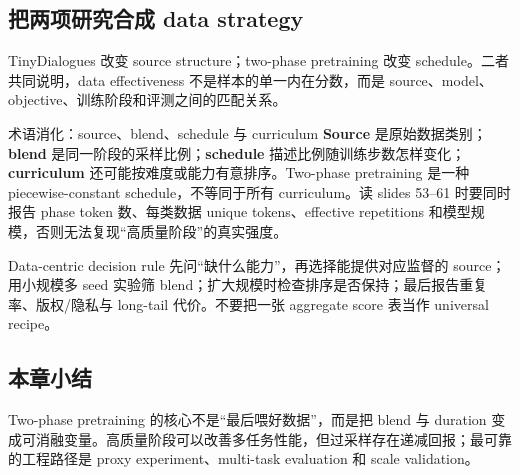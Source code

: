 \subsection{把两项研究合成 data strategy}

TinyDialogues 改变 source structure；two-phase pretraining 改变 schedule。二者共同说明，data effectiveness 不是样本的单一内在分数，而是 source、model、objective、训练阶段和评测之间的匹配关系。







\begin{knowledgebox}{术语消化：source、blend、schedule 与 curriculum}
\textbf{Source} 是原始数据类别；\textbf{blend} 是同一阶段的采样比例；\textbf{schedule} 描述比例随训练步数怎样变化；\textbf{curriculum} 还可能按难度或能力有意排序。Two-phase pretraining 是一种 piecewise-constant schedule，不等同于所有 curriculum。读 slides 53--61 时要同时报告 phase token 数、每类数据 unique tokens、effective repetitions 和模型规模，否则无法复现“高质量阶段”的真实强度。
\end{knowledgebox}

\begin{importantbox}{Data-centric decision rule}
先问“缺什么能力”，再选择能提供对应监督的 source；用小规模多 seed 实验筛 blend；扩大规模时检查排序是否保持；最后报告重复率、版权/隐私与 long-tail 代价。不要把一张 aggregate score 表当作 universal recipe。
\end{importantbox}

\subsection{本章小结}

Two-phase pretraining 的核心不是“最后喂好数据”，而是把 blend 与 duration 变成可消融变量。高质量阶段可以改善多任务性能，但过采样存在递减回报；最可靠的工程路径是 proxy experiment、multi-task evaluation 和 scale validation。

